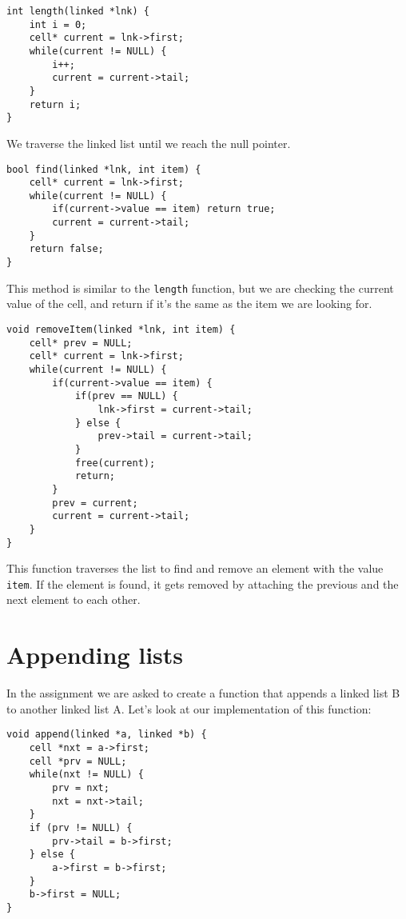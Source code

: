 \documentclass[a4paper,11pt]{article}
\begin{document}
    \begin{verbatim}
int length(linked *lnk) {
    int i = 0;
    cell* current = lnk->first;
    while(current != NULL) {
        i++;
        current = current->tail;
    }
    return i;
}
    \end{verbatim}

    We traverse the linked list until we reach the null pointer.

    \begin{verbatim}
bool find(linked *lnk, int item) {
    cell* current = lnk->first;
    while(current != NULL) {
        if(current->value == item) return true;
        current = current->tail;
    }
    return false;
}
    \end{verbatim}

    This method is similar to the {\tt length} function, but we are checking the current value of the cell, and return if it's the same as the item we are looking for.

    \begin{verbatim}
void removeItem(linked *lnk, int item) {
    cell* prev = NULL;
    cell* current = lnk->first;
    while(current != NULL) {
        if(current->value == item) {
            if(prev == NULL) {
                lnk->first = current->tail;
            } else {
                prev->tail = current->tail;
            }
            free(current);
            return;
        }
        prev = current;
        current = current->tail;
    }
}
    \end{verbatim}

    This function traverses the list to find and remove an element with the value {\tt item}.
    If the element is found, it gets removed by attaching the previous and the next element to each other.

    \section*{Appending lists}

    In the assignment we are asked to create a function that appends a linked list B to another linked list A.
    Let's look at our implementation of this function:

    \begin{verbatim}
void append(linked *a, linked *b) {
    cell *nxt = a->first;
    cell *prv = NULL;
    while(nxt != NULL) {
        prv = nxt;
        nxt = nxt->tail;
    }
    if (prv != NULL) {
        prv->tail = b->first;
    } else {
        a->first = b->first;
    }
    b->first = NULL;
}
    \end{verbatim}
\end{document}
